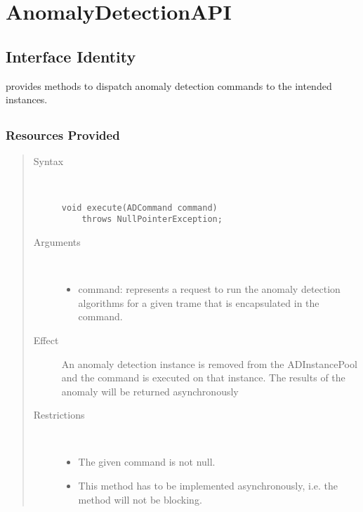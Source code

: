 \section{AnomalyDetectionAPI}
\label{api:anomaly-detection-api}

\subsection{Interface Identity}

\npar {} provides methods to dispatch anomaly
detection commands to the intended instances.

\subsection{}

\subsubsection{Resources Provided}

\begin{quote}
	\begin{description}
		\item[Syntax] \ 
		\begin{verbatim}
void execute(ADCommand command) 
    throws NullPointerException;
		\end{verbatim}
		\item[Arguments] \
		\begin{itemize}
			\item command: represents a request to run the anomaly detection algorithms
			for a given trame that is encapsulated in the command.
		\end{itemize}
		\item[Effect] An anomaly detection instance is removed from the ADInstancePool
		and the command is executed on that instance. The results of the anomaly will
		be returned asynchronously 
		\item[Restrictions] \ 
		\begin{itemize}
			\item The given command is not null.
			\item This method has to be implemented asynchronously, i.e. the method will
			not be blocking.
		\end{itemize}
	\end{description} 
\end{quote}

